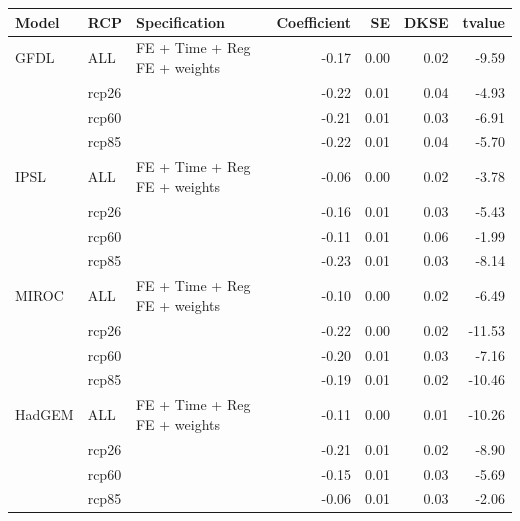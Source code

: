 \begin{tabular}{lllrrrr}
  \hline
Model & RCP & Specification & Coefficient & SE & DKSE & tvalue \\ 
  \hline
GFDL & ALL & FE + Time + Reg FE + weights & -0.17 & 0.00 & 0.02 & -9.59 \\ 
   & rcp26 &  & -0.22 & 0.01 & 0.04 & -4.93 \\ 
   & rcp60 &  & -0.21 & 0.01 & 0.03 & -6.91 \\ 
   & rcp85 &  & -0.22 & 0.01 & 0.04 & -5.70 \\ 
  IPSL & ALL & FE + Time + Reg FE + weights & -0.06 & 0.00 & 0.02 & -3.78 \\ 
   & rcp26 &  & -0.16 & 0.01 & 0.03 & -5.43 \\ 
   & rcp60 &  & -0.11 & 0.01 & 0.06 & -1.99 \\ 
   & rcp85 &  & -0.23 & 0.01 & 0.03 & -8.14 \\ 
  MIROC & ALL & FE + Time + Reg FE + weights & -0.10 & 0.00 & 0.02 & -6.49 \\ 
   & rcp26 &  & -0.22 & 0.00 & 0.02 & -11.53 \\ 
   & rcp60 &  & -0.20 & 0.01 & 0.03 & -7.16 \\ 
   & rcp85 &  & -0.19 & 0.01 & 0.02 & -10.46 \\ 
  HadGEM & ALL & FE + Time + Reg FE + weights & -0.11 & 0.00 & 0.01 & -10.26 \\ 
   & rcp26 &  & -0.21 & 0.01 & 0.02 & -8.90 \\ 
   & rcp60 &  & -0.15 & 0.01 & 0.03 & -5.69 \\ 
   & rcp85 &  & -0.06 & 0.01 & 0.03 & -2.06 \\ 
   \hline
\end{tabular}

